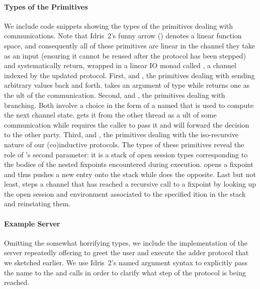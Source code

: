 \documentclass{easychair}
\begin{document}
\paragraph{Types of the Primitives} We include code snippets showing the
types of the primitives dealing with communications. Note that Idris~2's
funny arrow () denotes a linear function space, and
consequently all of these primitives are linear in the channel
they take as an input (ensuring it cannot be reused after the protocol
has been stepped) and systematically return, wrapped in a linear IO
monad called , a channel indexed by the updated protocol.
%
First,  and , the primitives
dealing with sending arbitrary values back and forth.
 takes an argument of type  while
 returns one as the ult of the
communication.
%
%
Second,  and , the primitives
dealing with branching.
%
Both involve a choice in the form of a  named 
that is used to compute the next channel state.
%
 gets it from the other thread as a ult
of some communication while  requires the caller to
pass it and will forward the decision to the other party.
%
%
Third,  and , the
primitives dealing with the iso-recursive nature of our
(co)inductive protocols.
%
The types of these primitives reveal the role of 's
second parameter: it is a stack of open session types corresponding
to the bodies of the nested fixpoints encountered during execution.
%
 opens a fixpoint and thus pushes a new entry onto the
stack  while  does the opposite.
%
Last but not least,  steps a channel that has
reached a recursive call to a fixpoint by looking up the
open session and environment associated to the specified
ition in the stack and reinstating them.

\paragraph{Example Server} Omitting the somewhat horrifying types,
we include the implementation of the server repeatedly offering
to greet the user and execute the adder protocol that we sketched
earlier.
%
We use Idris~2's named argument syntax to explicitly pass the name
 to the  and 
calls in order to clarify what step of the protocol is being reached.
\end{document}
